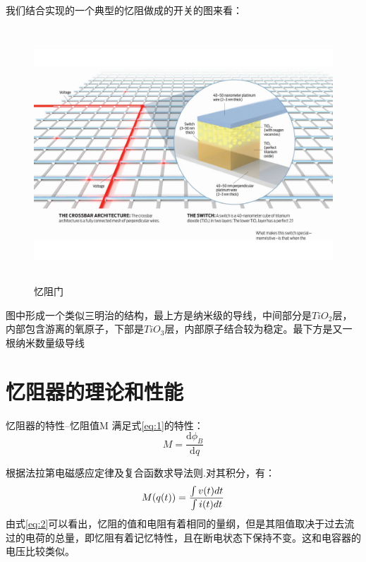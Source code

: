 \documentclass[UTF8]{article}
\begin{document}
%
我们结合实现的一个典型的忆阻做成的开关的图来看：
\begin{figure}[htbp]
\centering
\includegraphics[width=5.77in,height=3.75in]{pic/7}

\caption{忆阻门}
\label{fig:7}
\end{figure}
图中形成一个类似三明治的结构，最上方是纳米级的导线，中间部分是$TiO_{2}$层，内部包含游离的氧原子，下部是$TiO_{3}$层，内部原子结合较为稳定。最下方是又一根纳米数量级导线






\section{忆阻器的理论和性能}

忆阻器的特性--忆阻值M 满足式\eqref{eq:1}的特性：
\begin{equation}\label{eq:1}
M = \frac{\mathrm d\phi_{B}}{\mathrm dq}
\end{equation}

根据法拉第电磁感应定律及复合函数求导法则.对其积分，有：
\begin{equation}\label{eq:2}
M(q(t)) = \frac{\int\mathnormal{v(t)dt}}{\int\mathnormal{i(t)dt}}
\end{equation}
由式\eqref{eq:2}可以看出，忆阻的值和电阻有着相同的量纲，但是其阻值取决于过去流过的电荷的总量，即忆阻有着记忆特性，且在断电状态下保持不变。这和电容器的电压比较类似。
\end{document}
